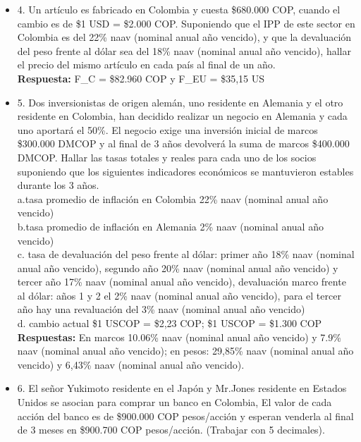 \begin{itemize}
 \item 4. Un  artículo  es  fabricado en  Colombia  y  cuesta \$680.000 COP,  cuando  el cambio es de \$1 USD = \$2.000 COP. Suponiendo que el IPP de este sector en Colombia es del 22\% naav (nominal anual año vencido), y que la devaluación del peso frente al dólar sea del 18\% naav (nominal anual año vencido), hallar el precio del mismo artículo en cada país al final de un año.\\
       \textbf{Respuesta:} F_{C} = \$82.960 COP y F_{EU} = \$35,15 US\\
       \medskip

 \item 5. Dos  inversionistas  de  origen  alemán,  uno  residente  en  Alemania  y el  otro residente  en  Colombia,  han  decidido  realizar  un  negocio  en  Alemania  y cada uno aportará el 50\%. El negocio exige una inversión inicial de marcos \$300.000  DMCOP   y   al   final   de   3   años   devolverá   la   suma   de   marcos \$400.000 DMCOP. Hallar las tasas totales y reales para cada uno de los socios suponiendo  que  los  siguientes  indicadores  económicos  se  mantuvieron estables durante los 3 años.\\

       a.tasa promedio de inflación en Colombia 22\% naav (nominal anual año vencido)\\
       b.tasa promedio de inflación en Alemania 2\% naav (nominal anual año vencido)\\
       c.   tasa  de  devaluación  del  peso  frente  al  dólar:  primer  año  18\% naav (nominal anual año vencido), segundo  año  20\% naav (nominal anual año vencido)  y  tercer  año  17\% naav (nominal anual año vencido),  devaluación  marco frente  al  dólar:  años  1  y  2  el  2\% naav (nominal anual año vencido),  para  el  tercer  año  hay  una revaluación del 3\% naav (nominal anual año vencido)\\
       d. cambio actual \$1 USCOP  =  \$2,23 COP; \$1 USCOP = \$1.300 COP\\
       \medskip
       \textbf{Respuestas:} En marcos 10.06\% naav (nominal anual año vencido) y 7.9\% naav (nominal anual año vencido); en pesos: 29,85\% naav (nominal anual año vencido) y 6,43\% naav (nominal anual año vencido).\\
       \medskip

 \item 6. El señor Yukimoto residente en el Japón y Mr.Jones residente en Estados Unidos  se  asocian para comprar un banco en Colombia, El valor de cada acción del banco es de \$900.000 COP pesos/acción y esperan venderla al final de 3 meses en \$900.700 COP pesos/acción. (Trabajar con 5 decimales).\\


\end{itemize}
